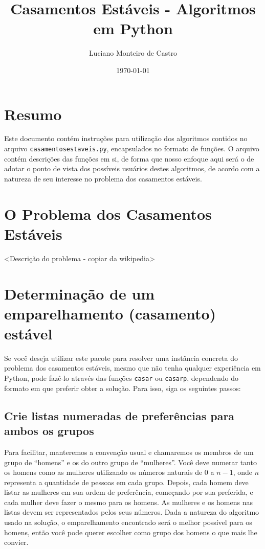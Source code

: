 \documentclass[11pt]{article}
\title{Casamentos Estáveis - Algoritmos em Python}
\author{Luciano Monteiro de Castro}
\date{\today}
\begin{document}
\maketitle

\setcounter{tocdepth}{3}
\tableofcontents
\vspace*{1cm}

\section{Resumo}
\label{sec-1}

Este documento contém instruções para utilização dos algoritmos contidos no
arquivo \verb|casamentosestaveis.py|, encapsulados no formato de funções. 
O arquivo contém descrições das funções em si, de forma que nosso enfoque aqui
será o de adotar o ponto de vista dos possíveis usuários destes algoritmos,
de acordo com a natureza de seu interesse no problema dos casamentos estáveis.
\section{O Problema dos Casamentos Estáveis}
\label{sec-2}


<Descrição do problema - copiar da wikipedia>
\section{Determinação de um emparelhamento (casamento) estável}
\label{sec-3}

Se você deseja utilizar este pacote para resolver uma instância concreta do problema
dos casamentos estáveis, mesmo que não tenha qualquer experiência em Python, 
pode fazê-lo através das funções \verb|casar| ou 
\verb|casarp|, dependendo do formato em que preferir obter a solução.
Para isso, siga os seguintes passos:
\subsection{Crie listas numeradas de preferências para ambos os grupos}
\label{sec-3-1}

Para facilitar, manteremos a convenção usual e chamaremos os membros de um grupo de
``homens'' e os do outro grupo de ``mulheres''. Você deve numerar tanto os homens como
as mulheres utilizando os números naturais de $0$ a $n-1$, onde $n$ representa a
quantidade de pessoas em cada grupo. Depois, cada homem deve listar as mulheres em
sua ordem de preferência, começando por sua preferida, e cada mulher deve fazer o
mesmo para os homens. As mulheres e os homens nas listas devem ser representados pelos
seus números. Dada a natureza do algoritmo usado na solução, o emparelhamento
encontrado será o melhor possível para os homens, então você pode querer escolher
como grupo dos homens o que mais lhe convier.
\end{document}
